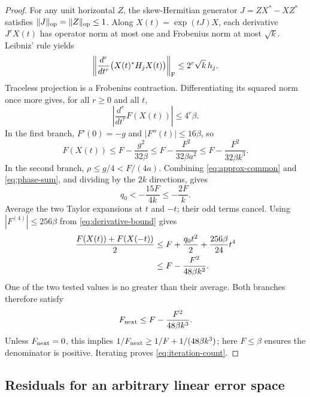 \documentclass[11pt]{article}
\theoremstyle{remark}
\numberwithin{equation}{section}
\begin{document}
\begin{proof}
For any unit horizontal $Z$, the skew-Hermitian generator
$J=ZX^*-XZ^*$ satisfies $\|J\|_{\rm op}=\|Z\|_{\rm op}\le1$.
Along $X(t)=\exp(tJ)X$, each derivative $J^rX(t)$ has operator norm
at most one and Frobenius norm at most $\sqrt{k}$. Leibniz' rule yields
\[
 \left\|\frac{d^r}{dt^r}\bigl(X(t)^*H_jX(t)\bigr)\right\|_{\rm F}
 \le 2^r\sqrt{k}\,h_j.
\]
Traceless projection is a Frobenius contraction. Differentiating its
squared norm once more gives, for all $r\ge0$ and all $t$,
\begin{equation}\label{eq:derivative-bound}
 \left|\frac{d^r}{dt^r}F(X(t))\right|\le4^r\beta.
\end{equation}
In the first branch, $F'(0)=-g$ and $|F''(t)|\le16\beta$, so
\begin{equation}\label{eq:gradient-decrease}
 F(X(t))\le F-\frac{g^2}{32\beta}
 \le F-\frac{F^2}{32\beta a^2}
 \le F-\frac{F^2}{32\beta k^3}.
\end{equation}
In the second branch, $\rho\le g/4<F/(4a)$. Combining
\eqref{eq:approx-common} and \eqref{eq:phase-sum}, and dividing by
the $2k$ directions, gives
\begin{equation}\label{eq:chosen-curvature}
 q_0<-\frac{15F}{4k}\le-\frac{2F}{k}.
\end{equation}
Average the two Taylor expansions at $t$ and $-t$; their odd terms
cancel. Using $|F^{(4)}|\le256\beta$ from
\eqref{eq:derivative-bound} gives
\begin{align}
 \frac{F(X(t))+F(X(-t))}{2}
 &\le F+\frac{q_0t^2}{2}+\frac{256\beta}{24}t^4\notag\\
 &\le F-\frac{F^2}{48\beta k^2}.\label{eq:curvature-decrease}
\end{align}
One of the two tested values is no greater than their average. Both
branches therefore satisfy
\begin{equation}\label{eq:uniform-decrease}
 F_{\rm next}\le F-\frac{F^2}{48\beta k^3}.
\end{equation}
Unless $F_{\rm next}=0$, this implies
$1/F_{\rm next}\ge1/F+1/(48\beta k^3)$; here $F\le\beta$ ensures
the denominator is positive. Iterating proves \eqref{eq:iteration-count}.
\end{proof}

\subsection{Residuals for an arbitrary linear error space}
\end{document}
